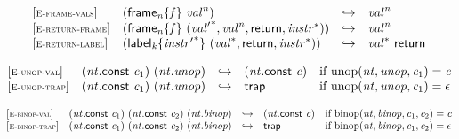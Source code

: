$$
\begin{array}{@{}l@{}lcl@{}l@{}}
{[\textsc{\scriptsize E{-}frame{-}vals}]} \quad & ({{\mathsf{frame}}_{{\mathit{n}}}}{\{{\mathit{f}}\}}~{{\mathit{val}}^{{\mathit{n}}}}) &\hookrightarrow& {{\mathit{val}}^{{\mathit{n}}}} &  \\
{[\textsc{\scriptsize E{-}return{-}frame}]} \quad & ({{\mathsf{frame}}_{{\mathit{n}}}}{\{{\mathit{f}}\}}~({{\mathit{val}'}^\ast}, {{\mathit{val}}^{{\mathit{n}}}}, \mathsf{return}, {{\mathit{instr}}^\ast})) &\hookrightarrow& {{\mathit{val}}^{{\mathit{n}}}} &  \\
{[\textsc{\scriptsize E{-}return{-}label}]} \quad & ({{\mathsf{label}}_{{\mathit{k}}}}{\{{{\mathit{instr}'}^\ast}\}}~({{\mathit{val}}^\ast}, \mathsf{return}, {{\mathit{instr}}^\ast})) &\hookrightarrow& {{\mathit{val}}^\ast}~\mathsf{return} &  \\
\end{array}
$$

\vspace{1ex}

$$
\begin{array}{@{}l@{}lcl@{}l@{}}
{[\textsc{\scriptsize E{-}unop{-}val}]} \quad & ({\mathit{nt}}.\mathsf{const}~{\mathit{c}}_{{1}})~({\mathit{nt}} . {\mathit{unop}}) &\hookrightarrow& ({\mathit{nt}}.\mathsf{const}~{\mathit{c}}) &\quad
  \mbox{if}~{\mathrm{unop}}({\mathit{nt}}, {\mathit{unop}}, {\mathit{c}}_{{1}}) = {\mathit{c}} \\
{[\textsc{\scriptsize E{-}unop{-}trap}]} \quad & ({\mathit{nt}}.\mathsf{const}~{\mathit{c}}_{{1}})~({\mathit{nt}} . {\mathit{unop}}) &\hookrightarrow& \mathsf{trap} &\quad
  \mbox{if}~{\mathrm{unop}}({\mathit{nt}}, {\mathit{unop}}, {\mathit{c}}_{{1}}) = \epsilon \\
\end{array}
$$

\vspace{1ex}

$$
\begin{array}{@{}l@{}lcl@{}l@{}}
{[\textsc{\scriptsize E{-}binop{-}val}]} \quad & ({\mathit{nt}}.\mathsf{const}~{\mathit{c}}_{{1}})~({\mathit{nt}}.\mathsf{const}~{\mathit{c}}_{{2}})~({\mathit{nt}} . {\mathit{binop}}) &\hookrightarrow& ({\mathit{nt}}.\mathsf{const}~{\mathit{c}}) &\quad
  \mbox{if}~{\mathrm{binop}}({\mathit{nt}}, {\mathit{binop}}, {\mathit{c}}_{{1}}, {\mathit{c}}_{{2}}) = {\mathit{c}} \\
{[\textsc{\scriptsize E{-}binop{-}trap}]} \quad & ({\mathit{nt}}.\mathsf{const}~{\mathit{c}}_{{1}})~({\mathit{nt}}.\mathsf{const}~{\mathit{c}}_{{2}})~({\mathit{nt}} . {\mathit{binop}}) &\hookrightarrow& \mathsf{trap} &\quad
  \mbox{if}~{\mathrm{binop}}({\mathit{nt}}, {\mathit{binop}}, {\mathit{c}}_{{1}}, {\mathit{c}}_{{2}}) = \epsilon \\
\end{array}
$$

